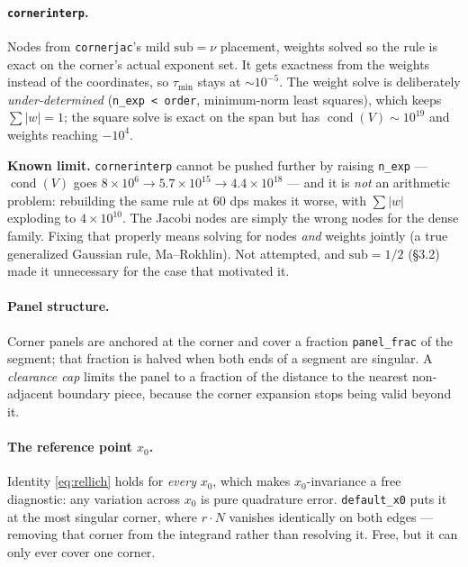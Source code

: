 \documentclass[11pt]{article}
\newcommand{\code}[1]{\texttt{#1}}
\begin{document}
\paragraph{\code{cornerinterp}.} Nodes from \code{cornerjac}'s mild
$\text{sub} = \nu$ placement, weights solved so the rule is exact on the corner's
actual exponent set. It gets exactness from the weights instead of the
coordinates, so $\tau_{\min}$ stays at ${\sim}10^{-5}$. The weight solve is
deliberately \emph{under-determined} (\code{n\_exp < order}, minimum-norm least
squares), which keeps $\sum|w| = 1$; the square solve is exact on the span but
has $\operatorname{cond}(V) \sim 10^{19}$ and weights reaching $-10^4$.

\medskip\noindent
\textbf{Known limit.} \code{cornerinterp} cannot be pushed further by raising
\code{n\_exp} --- $\operatorname{cond}(V)$ goes
$8\!\times\!10^{6} \to 5.7\!\times\!10^{15} \to 4.4\!\times\!10^{18}$ --- and it
is \emph{not} an arithmetic problem: rebuilding the same rule at 60 dps makes it
worse, with $\sum|w|$ exploding to $4\!\times\!10^{10}$. The Jacobi nodes are
simply the wrong nodes for the dense family. Fixing that properly means solving
for nodes \emph{and} weights jointly (a true generalized Gaussian rule,
Ma--Rokhlin). Not attempted, and $\text{sub} = 1/2$ (\S3.2) made it unnecessary
for the case that motivated it.

\paragraph{Panel structure.} Corner panels are anchored at the corner and cover a
fraction \code{panel\_frac} of the segment; that fraction is halved when both
ends of a segment are singular. A \emph{clearance cap} limits the panel to a
fraction of the distance to the nearest non-adjacent boundary piece, because the
corner expansion stops being valid beyond it.

\paragraph{The reference point $x_0$.} Identity \eqref{eq:rellich} holds for
\emph{every} $x_0$, which makes $x_0$-invariance a free diagnostic: any variation
across $x_0$ is pure quadrature error. \code{default\_x0} puts it at the most
singular corner, where $r\cdot N$ vanishes identically on both edges --- removing
that corner from the integrand rather than resolving it. Free, but it can only
ever cover one corner.
\end{document}
